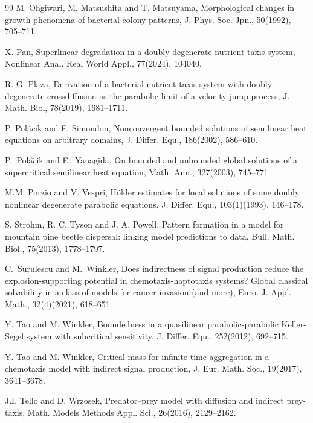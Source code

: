 \documentclass[12pt]{article}
\theoremstyle{plain}
\theoremstyle{definition}
\numberwithin{equation}{section}
\begin{document}
\begin{thebibliography}{99}
M. Ohgiwari, M. Matsushita and  T. Matsuyama, Morphological changes in growth phenomena of bacterial
colony patterns, J. Phys. Soc. Jpn., 50(1992), 705--711.

X. Pan, Superlinear degradation in a doubly degenerate nutrient taxis system, Nonlinear Anal. Real World Appl., 77(2024), 104040.

R. G. Plaza, Derivation of a bacterial nutrient-taxis system with doubly degenerate crossdiffusion as the parabolic limit of a velocity-jump process, J. Math. Biol, 78(2019), 1681--1711.

P. Pol\'{a}$\breve{c}$ik  and F. Simondon, Nonconvergent bounded solutions of semilinear heat equations on arbitrary domains, J. Differ. Equ., 186(2002), 586--610.

P.~Pol\'{a}$\breve{c}$ik and E.~Yanagida, On bounded and unbounded global solutions of a supercritical semilinear heat equation, Math. Ann., 327(2003), 745--771.


 M.M. Porzio and V. Vespri, H\"{o}lder estimates for local solutions of some doubly nonlinear degenerate parabolic equations,  J. Differ. Equ., 103(1)(1993), 146--178.

S. Strohm, R. C. Tyson and J. A. Powell, Pattern formation in a model for mountain
pine beetle dispersal: linking model predictions to data, Bull. Math. Biol.,  75(2013), 1778--1797.

C.~Surulescu  and M.~Winkler,
Does indirectness of signal production reduce the explosion-supporting potential in chemotaxis-haptotaxis systems? Global classical
solvability in a class of models for cancer invasion (and more), Euro. J. Appl. Math., 32(4)(2021), 618--651.


 Y. Tao and  M. Winkler, Boundedness in a quasilinear parabolic-parabolic Keller-Segel system with subcritical sensitivity, J. Differ. Equ., 252(2012), 692--715.

Y. Tao and M. Winkler, Critical mass for infinite-time aggregation in a chemotaxis model with indirect signal production, J. Eur. Math. Soc., 19(2017), 3641--3678.



J.I. Tello and  D. Wrzosek,  Predator--prey model with diffusion and indirect prey-taxis, Math. Models Methods Appl. Sci., 26(2016), 2129--2162.





\end{thebibliography}
\end{document}
